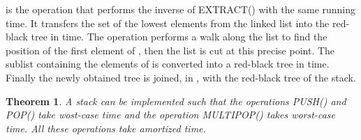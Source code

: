 \documentclass[letterpaper,11pt]{article}
\newtheorem{thm}{Theorem}
\begin{document}
 is the operation that performs the inverse of {E{\scriptsize XTRACT}()} with the same running time. It transfers the set  of the  lowest elements from the linked list into the red-black tree in  time. The operation performs a walk along the list to find the position of the first element of , then the list is cut at this precise point. The sublist containing the elements of  is converted into a red-black tree in  time. Finally the newly obtained tree is joined, in , with the red-black tree of the stack.\\

\begin{thm}
A stack can be implemented such that the operations {P{\scriptsize USH}()} and {P{\scriptsize OP}()} take  wost-case time and the operation {M{\scriptsize ULTIPOP}()} takes  worst-case time. All these operations take  amortized time. 
\end{thm}
\end{document}
